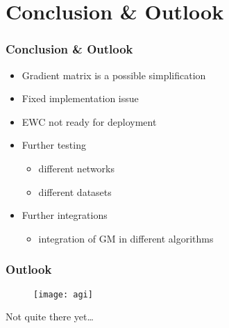 \section{Conclusion \& Outlook}
    
    \begin{frame}
        \frametitle{Conclusion \& Outlook}
        
        \begin{itemize}
            \item Gradient matrix is a possible simplification
            \item Fixed implementation issue
            \item EWC not ready for deployment
        \end{itemize}
        \pause
        \begin{itemize}
            \item Further testing
            \begin{itemize}
                \item different networks
                \item different datasets
            \end{itemize}
            \item Further integrations
            \begin{itemize}
                \item integration of GM in different algorithms
            \end{itemize}
        \end{itemize}

    \end{frame}
    \begin{frame}
        \frametitle{Outlook}
        
        \begin{figure}[H]
            \centering
            \texttt{[image: agi]}
        \end{figure}

        \pause
        \centering \LARGE
        Not quite there yet…

    \end{frame}